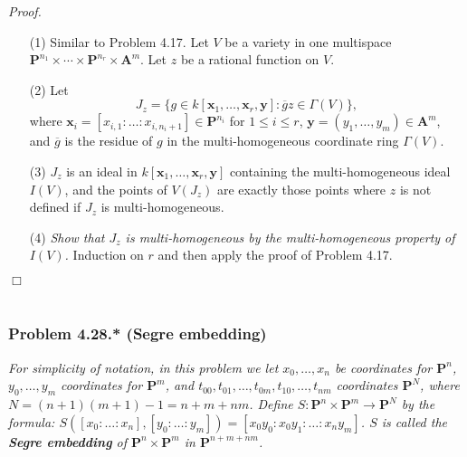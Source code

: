 \documentclass{article}
\begin{document}
\emph{Proof.}
\begin{enumerate}
\item[(1)]
  Similar to Problem 4.17.
  Let $V$ be a variety in one multispace
  $\mathbf{P}^{n_1} \times \cdots \times \mathbf{P}^{n_r} \times \mathbf{A}^{m}$.
  Let $z$ be a rational function on $V$.

\item[(2)]
  Let
  \[
    J_z = \{ g \in k[\mathbf{x}_1, \ldots, \mathbf{x}_{r}, \mathbf{y}]
      : \overline{g}z \in \Gamma(V) \},
  \]
  where
  $\mathbf{x}_i = [x_{i,1} : \ldots : x_{i,n_i+1}] \in \mathbf{P}^{n_i}$ for $1 \leq i \leq r$,
  $\mathbf{y} = (y_1, \ldots, y_m) \in \mathbf{A}^{m}$,
  and $\overline{g}$ is the residue of $g$ in the multi-homogeneous coordinate ring $\Gamma(V)$.

\item[(3)]
  $J_z$ is an ideal in $k[\mathbf{x}_1, \ldots, \mathbf{x}_{r}, \mathbf{y}]$
  containing the multi-homogeneous ideal $I(V)$,
  and the points of $V(J_z)$ are exactly those points where $z$ is not defined
  if $J_z$ is multi-homogeneous.

\item[(4)]
  \emph{Show that $J_z$ is multi-homogeneous by the multi-homogeneous property of $I(V)$.}
  Induction on $r$ and then apply the proof of Problem 4.17.
\end{enumerate}
$\Box$ \\\\






\subsubsection*{Problem 4.28.* (Segre embedding)}
\emph{For simplicity of notation,
in this problem we let $x_0, \ldots, x_n$ be coordinates for $\mathbf{P}^{n}$,
$y_0, \ldots, y_m$ coordinates for $\mathbf{P}^{m}$,
and $t_{00}, t_{01}, \ldots, t_{0m}, t_{10}, \ldots, t_{nm}$ coordinates $\mathbf{P}^{N}$,
where $N = (n+1)(m+1)-1 = n+m+nm$.
Define $S: \mathbf{P}^{n} \times \mathbf{P}^{m} \to \mathbf{P}^{N}$
by the formula:
$S([x_0 : \ldots : x_n], [y_0 : \ldots : y_m]) = [x_0 y_0 : x_0 y_1 : \ldots : x_n y_m]$.
$S$ is called the \textbf{Segre embedding} of $\mathbf{P}^{n} \times \mathbf{P}^{m}$
in $\mathbf{P}^{n+m+nm}$.}
\end{document}

